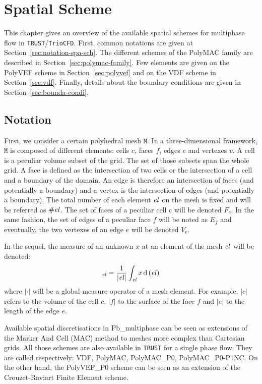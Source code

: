 \chapter{Spatial Scheme}
\label{sec:spatial_scheme}

This chapter gives an overview of the available spatial schemes for multiphase flow in \texttt{TRUST}/\texttt{TrioCFD}. First, common notations are given at Section~\ref{sec:notation-spa-sch}. The different schemes of the PolyMAC family are described in Section~\ref{sec:polymac-family}. Few elements are given on the PolyVEF scheme in Section~\ref{sec:polyvef} and on the VDF scheme in Section~\ref{sec:vdf}. Finally, details about the boundary conditions are given in Section~\ref{sec:bounda-condi}.

\section{Notation\label{sec:notation-spa-sch}}
First, we consider a certain polyhedral mesh $\mathtt{M}$. In a three-dimensional framework, $\mathtt{M}$ is composed of different elements: cells $c$, faces $f$, edges $e$ and vertexes $v$. A cell is a peculiar volume subset of the grid. The set of those subsets span the whole grid. A face is defined as the intersection of two cells or the intersection of a cell and a boundary of the domain. An edge is therefore an intersection of faces (and potentially a boundary) and a vertex is the intersection of edges (and potentially a boundary). The total number of each element $\mathit{el}{}$ on the mesh is fixed and will be referred as $\# \mathit{el}{}$. The set of faces of a peculiar cell c will be denoted $F_c$. In the same fashion, the set of edges of a peculiar face $f$ will be noted as $E_f$ and eventually, the two vertexes of an edge $e$ will be denoted $V_e$. 

In the sequel, the measure of an unknown $x$ at an element of the mesh $\mathit{el}{}$ will be denoted: 
\begin{equation}
    [x]_{\myel} = \frac{1}{|\myel|} \int_{\myel} x \, \text{d}\, (\myel)
\end{equation}
where $|\cdot|$ will be a global measure operator of a mesh element. For example, $|c|$ refers to the volume of the cell $c$, $|f|$ to the surface of the face $f$ and $|e|$ to the length of the edge $e$.

Available spatial discretisations in Pb\_multiphase can be seen as extensions of the Marker And Cell (MAC) method \cite{harlow1965numerical} to meshes more complex than Cartesian grids. All those schemes are also available in \texttt{TRUST} \cite{trustonline} for a single phase flow. They are called respectively: VDF, PolyMAC, PolyMAC\_P0, PolyMAC\_P0-P1NC. On the other hand, the PolyVEF\_P0 scheme can be seen as an extension of the Crouzet-Raviart Finite Element scheme.


